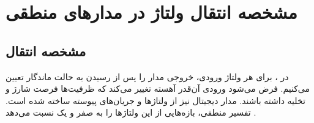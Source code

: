 \ifCompleteNotes\else
{}
\setcounter{chapter}{1}
\chapter{مشخصه انتقال ولتاژ در مدارهای منطقی}
\fi
\setcounter{section}{4}
\section{مشخصه انتقال }
\label{sec:dc-transfer}
در ، برای هر ولتاژ ورودی، خروجی
مدار را پس از رسیدن به حالت ماندگار تعیین می‌کنیم. فرض می‌شود
ورودی آن‌قدر آهسته تغییر می‌کند که ظرفیت‌ها فرصت شارژ و تخلیه
داشته باشند. مدار دیجیتال نیز از ولتاژها و جریان‌های پیوسته
ساخته شده است. تفسیر منطقی، بازه‌هایی از این ولتاژها را به صفر
و یک نسبت می‌دهد \cite[مقدمه بخش ، صفحه ۸۷]{weste}.
\ifCompleteNotes
{}
\fi




